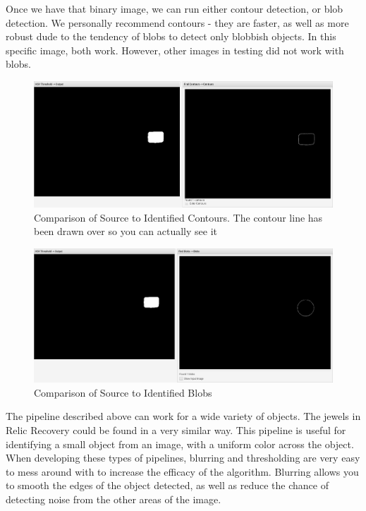 \documentclass[../main.tex]{subfiles}
\begin{document}
Once we have that binary image, we can run either contour detection, or blob detection. We personally recommend contours - they are faster, as well as more robust dude to the tendency of blobs to detect only blobbish objects. In this specific image, both work. However, other images in testing did not work with blobs.
\begin{figure}[H]
    \centering
    \includegraphics[width=400pt]{sections/vision/images/opencv/gold_pipeline_contour.png}
    \caption{Comparison of Source to Identified Contours. The contour line has been drawn over so you can actually see it}
\end{figure}
\begin{figure}[H]
    \centering
    \includegraphics[width=400pt]{sections/vision/images/opencv/gold_pipeline_blob.png}
    \caption{Comparison of Source to Identified Blobs}
\end{figure}

The pipeline described above can work for a wide variety of objects. The jewels in Relic Recovery could be found in a very similar way. This pipeline is useful for identifying a small object from an image, with a uniform color across the object. When developing these types of pipelines, blurring and thresholding are very easy to mess around with to increase the efficacy of the algorithm. Blurring allows you to smooth the edges of the object detected, as well as reduce the chance of detecting noise from the other areas of the image.
\end{document}
